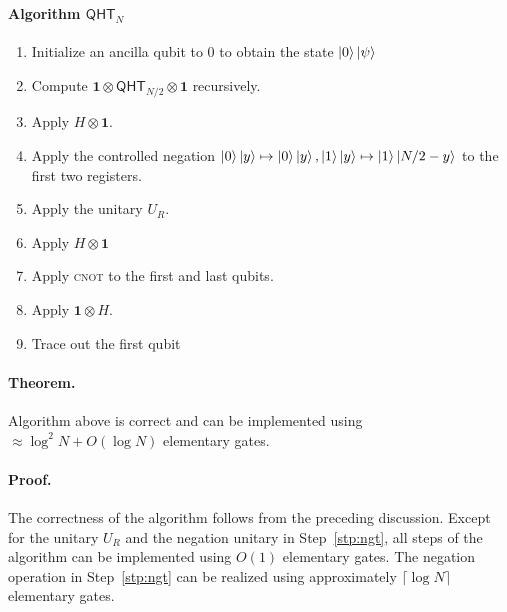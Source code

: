 \documentclass[12pt]{report}
\newcommand{\qht}{\mathsf{QHT}}
\begin{document}
\paragraph{Algorithm $\qht_N$}

\begin{enumerate}%
    \item Initialize an ancilla qubit to $0$ to obtain the state $\ket{0}\ket{\psi}$
    \item Compute $\mathbf{1} \otimes \qht_{N / 2} \otimes \mathbf{1}$ recursively.
    \item Apply $H \otimes \mathbf{1}$.
    \item\label{stp:ngt} Apply the controlled negation $\ket{0}\ket{y} \mapsto \ket{0}\ket{y}, \ket{1}\ket{y} \mapsto \ket{1}\ket{N / 2 -y}$ to the first two registers.
    \item Apply the unitary $U_R$.
    \item Apply $H \otimes \mathbf{1}$
    \item Apply \textsc{cnot} to the first and last qubits.
    \item Apply $\mathbf{1} \otimes H$.
    \item Trace out the first qubit
\end{enumerate}


\paragraph{Theorem.}
    \label{thm:qht-cost}
    Algorithm above is correct and can be implemented using $\approx \log^2 N + O(\log N)$ elementary gates.


\paragraph{Proof.}
    The correctness of the algorithm follows from the preceding discussion. Except for the unitary \( U_R \) and the negation unitary in Step~\ref{stp:ngt}, all steps of the algorithm can be implemented using \( O(1) \) elementary gates. The negation operation in Step~\ref{stp:ngt} can be realized using approximately \( \lceil \log N \rceil \) elementary gates.
    
\end{document}

